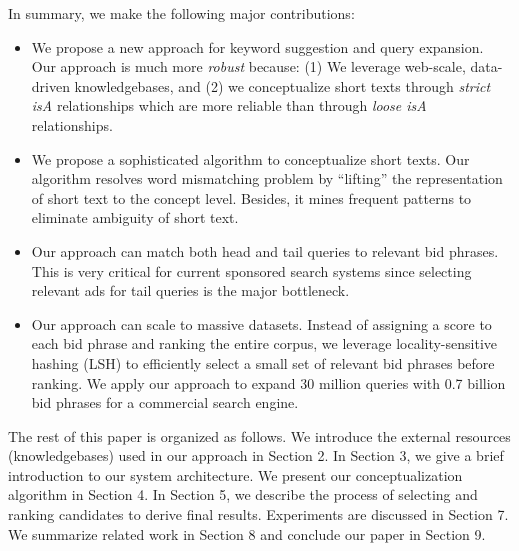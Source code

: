 In summary, we make the following major contributions:
\begin{itemize}
\item We propose a new approach for keyword suggestion and query
  expansion.  Our approach is much more \emph{robust} because: (1) We
  leverage web-scale, data-driven knowledgebases, and (2) we
  conceptualize short texts through \emph{strict isA} relationships
  which are more reliable than through \emph{loose isA} relationships.
\item We propose a sophisticated algorithm to conceptualize short
  texts.  Our algorithm resolves word mismatching problem by
  ``lifting'' the representation of short text to the concept level.
  Besides, it mines frequent patterns to eliminate ambiguity of short
  text.
\item Our approach can match both head and tail queries to relevant
  bid phrases.  This is very critical for current sponsored search
  systems since selecting relevant ads for tail queries is the major
  bottleneck.
\item Our approach can scale to massive datasets.  Instead of
  assigning a score to each bid phrase and ranking the entire corpus,
  we leverage locality-sensitive hashing (LSH) to efficiently select a
  small set of relevant bid phrases before ranking.  We apply our
  approach to expand 30 million queries with 0.7 billion bid phrases
  for a commercial search engine.
\end{itemize}



The rest of this paper is organized as follows.  We introduce the
external resources (knowledgebases) used in our approach in Section 2.
In Section 3, we give a brief introduction to our system architecture.
We present our conceptualization algorithm in Section 4.  In Section
5, we describe the process of selecting and ranking candidates to
derive final results.  Experiments are discussed in Section 7.  We
summarize related work in Section 8 and conclude our paper in Section
9.


